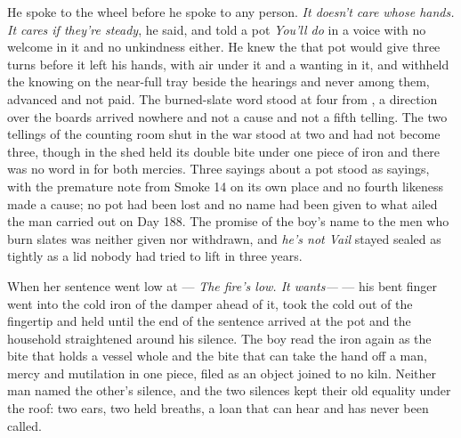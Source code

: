 He spoke to the wheel before he spoke to any person. \emph{It doesn't care whose hands. It cares if they're steady}, he said, and told a pot \emph{You'll do} in a voice with no welcome in it and no unkindness either. He knew the  that pot would give three turns before it left his hands, with air under it and a wanting in it, and withheld the knowing on the near-full tray beside the hearings and never among them, advanced and not paid. The burned-slate word stood at four from , a direction over the boards arrived nowhere and not a cause and not a fifth telling. The two tellings of the counting room shut in the war stood at two and had not become three, though  in the shed held its double bite under one piece of iron and there was no word in  for both mercies. Three sayings about a pot stood as sayings, with the premature note from Smoke 14 on its own place and no fourth likeness made a cause; no pot had been lost and no name had been given to what ailed the man carried out on Day 188. The promise of the boy's name to the men who burn slates was neither given nor withdrawn, and \emph{he's not Vail} stayed sealed as tightly as a lid nobody had tried to lift in three years.

When her sentence went low at  --- \emph{The fire's low. It wants---} --- his bent finger went into the cold iron of the damper ahead of it, took the cold out of the fingertip and held until the end of the sentence arrived at the pot and the household straightened around his silence. The boy read the iron again as the bite that holds a vessel whole and the bite that can take the hand off a man, mercy and mutilation in one piece, filed as an object joined to no kiln. Neither man named the other's silence, and the two silences kept their old equality under the roof: two ears, two held breaths, a loan that can hear and has never been called.

\scenebreak

